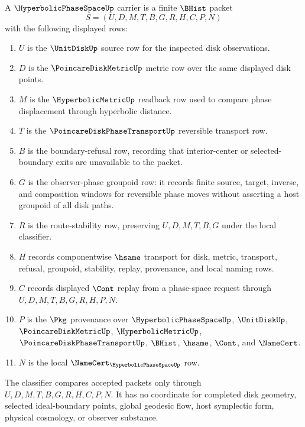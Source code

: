 \begin{definition}
\label{def:hyperbolic-phase-space-carrier}
A $\HyperbolicPhaseSpaceUp$ carrier is a finite $\BHist$ packet
$$
S=(U,D,M,T,B,G,R,H,C,P,N)
$$
with the following displayed rows:
\begin{enumerate}
\item $U$ is the $\UnitDiskUp$ source row for the inspected disk observations.
\item $D$ is the $\PoincareDiskMetricUp$ metric row over the same displayed disk points.
\item $M$ is the $\HyperbolicMetricUp$ readback row used to compare phase displacement through hyperbolic distance.
\item $T$ is the $\PoincareDiskPhaseTransportUp$ reversible transport row.
\item $B$ is the boundary-refusal row, recording that interior-center or selected-boundary exits are unavailable to the packet.
\item $G$ is the observer-phase groupoid row: it records finite source, target, inverse, and composition windows for reversible phase moves without asserting a host groupoid of all disk paths.
\item $R$ is the route-stability row, preserving $U,D,M,T,B,G$ under the local classifier.
\item $H$ records componentwise $\hsame$ transport for disk, metric, transport, refusal, groupoid, stability, replay, provenance, and local naming rows.
\item $C$ records displayed $\Cont$ replay from a phase-space request through $U,D,M,T,B,G,R,H,P,N$.
\item $P$ is the $\Pkg$ provenance over $\HyperbolicPhaseSpaceUp$, $\UnitDiskUp$, $\PoincareDiskMetricUp$, $\HyperbolicMetricUp$, $\PoincareDiskPhaseTransportUp$, $\BHist$, $\hsame$, $\Cont$, and $\NameCert$.
\item $N$ is the local $\NameCert_{\HyperbolicPhaseSpaceUp}$ row.
\end{enumerate}
The classifier compares accepted packets only through $U,D,M,T,B,G,R,H,C,P,N$. It has no coordinate for completed disk geometry, selected ideal-boundary points, global geodesic flow, host symplectic form, physical cosmology, or observer substance.
\end{definition}

